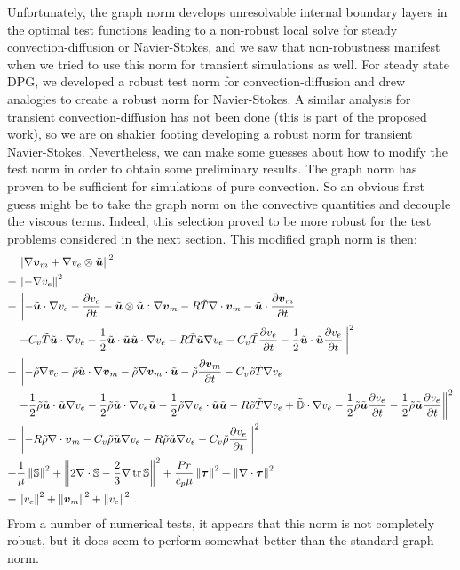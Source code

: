 \documentclass[Dissertation.tex]{subfiles}
\begin{document}
Unfortunately, the graph norm develops unresolvable internal boundary layers in the optimal test functions leading to a non-robust
local solve for steady convection-diffusion or Navier-Stokes,
and we saw that non-robustness manifest when we tried to use this norm for transient simulations as well.
For steady state DPG, we developed a robust test norm for convection-diffusion and drew analogies to create 
a robust norm for Navier-Stokes.
A similar analysis for transient convection-diffusion has not been done (this is part of the proposed work), 
so we are on shakier footing developing a robust norm for transient Navier-Stokes.
Nevertheless, we can make some guesses about how to modify the test norm in order to obtain some preliminary results.
The graph norm has proven to be sufficient for simulations of pure convection. 
So an obvious first guess might be to take the graph norm on the convective quantities and decouple the viscous terms.
Indeed, this selection proved to be more robust for the test problems considered in the next section.
This modified graph norm is then:
\begin{equation}
\begin{aligned}
&\left\| \nabla\boldsymbol v_m+\nabla v_e\otimes\tilde{\boldsymbol u} \right\|^2\\
+&\left\| -\nabla v_e \right\|^2\\
+&\left\|
-\tilde{\boldsymbol u}\cdot\nabla v_c-\frac{\partial v_c}{\partial t}-\tilde{\boldsymbol u}\otimes\tilde{\boldsymbol u}:\nabla\boldsymbol v_m
-R\tilde T\nabla\cdot\boldsymbol v_m-\tilde{\boldsymbol u}\cdot\frac{\partial\boldsymbol v_m}{\partial t}\right.\\
&\left.-C_v\tilde T\tilde{\boldsymbol u}\cdot\nabla v_e-\frac{1}{2}\tilde{\boldsymbol u}\cdot\tilde{\boldsymbol u}\tilde{\boldsymbol u}\cdot\nabla v_e
-R\tilde T\tilde{\boldsymbol u}\nabla v_e
-C_v\tilde T\frac{\partial v_e}{\partial t}-\frac{1}{2}\tilde{\boldsymbol u}\cdot\tilde{\boldsymbol u}\frac{\partial v_e}{\partial t}
\right\|^2\\
+&\left\|
-\tilde\rho\nabla v_c
-\tilde\rho\tilde{\boldsymbol u}\cdot\nabla\boldsymbol v_m-\tilde\rho\nabla\boldsymbol v_m\cdot\tilde{\boldsymbol u}
-\tilde\rho\frac{\partial\boldsymbol v_m}{\partial t}
-C_v\tilde\rho\tilde T\nabla v_e\right.\\
&\left.
-\frac{1}{2}\tilde\rho\tilde{\boldsymbol u}\cdot\tilde{\boldsymbol u}\nabla v_e
-\frac{1}{2}\tilde\rho\tilde{\boldsymbol u}\cdot\nabla v_e\tilde{\boldsymbol u}
-\frac{1}{2}\tilde\rho\nabla v_e\cdot\tilde{\boldsymbol u}\tilde{\boldsymbol u}
-R\tilde\rho\tilde T\nabla v_e
+\tilde{\mathbb{D}}\cdot\nabla v_e
-\frac{1}{2}\tilde\rho\tilde{\boldsymbol u}\frac{\partial v_e}{\partial t}
-\frac{1}{2}\tilde\rho\tilde{\boldsymbol u}\frac{\partial v_e}{\partial t}
\right\|^2\\
+&\left\|
-R\tilde\rho\nabla\cdot\boldsymbol v_m
-C_v\tilde\rho\tilde{\boldsymbol u}\nabla v_e
-R\tilde\rho\tilde{\boldsymbol u}\nabla v_e
-C_v\tilde\rho\frac{\partial v_e}{\partial t}
\right\|^2\\
+&\frac{1}{\mu}\left\| \mathbb{S} \right\|^2
+\left\| 2\nabla\cdot\mathbb{S}-\frac{2}{3}\nabla\operatorname*{tr}{\mathbb{S}} \right\|^2
+\frac{Pr}{c_p\mu}\left\| \boldsymbol\tau \right\|^2
+\left\| \nabla\cdot\boldsymbol\tau \right\|^2\\
+&\left\| v_c \right\|^2
+\left\| \boldsymbol v_m \right\|^2
+\left\| v_e \right\|^2
\,.
\end{aligned}
\end{equation}
From a number of numerical tests, it appears that this norm is not completely robust, but it does seem to perform somewhat better
than the standard graph norm.
\end{document}
